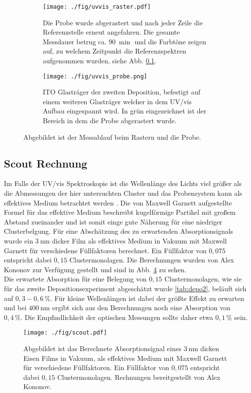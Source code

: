 \begin{figure}
    \begin{subfigure}[b]{0.65\textwidth}
      \texttt{[image: ./fig/uvvis\_raster.pdf]}
      \caption{Die Probe wurde abgerastert und nach jeder Zeile die Referenzstelle erneut angefahren. 
      Die gesamte Messdauer betrug ca. $\SI{90}{\min}$ und die Farbtöne zeigen auf, zu welchem Zeitpunkt die Referenzspektren aufgenommen wurden, siehe Abb. \ref{sec:scoutsim}.}
      \label{fig:uvvis_raster}
    \end{subfigure}\hfill
    \begin{subfigure}[b]{0.325\textwidth}
      \texttt{[image: ./fig/uvvis\_probe.png]}
      \caption{ITO Glasträger der zweiten Deposition, befestigt auf einem weiteren Glasträger welcher in dem UV/vis Aufbau eingespannt wird. In grün eingezeichnet ist der Bereich in dem die Probe abgerastert wurde.}
      \label{fig:uvvis_probe}
    \end{subfigure}
    \caption{Abgebildet ist der Messablauf beim Rastern und die Probe.} 
    \label{fig:uvvis_ablauf}
\end{figure}
\subsection{Scout Rechnung}
\label{sec:scoutsim}
Im Falle der UV/vis Spektroskopie ist die Wellenlänge des Lichts viel größer als die Abmessungen der hier untersuchten Cluster und das Probensystem kann als effektives Medium betrachtet werden \cite[S. 149 ff.]{Thei.1993}.
Die von Maxwell Garnett aufgestellte Formel für das effektive Medium beschreibt kugelförmige Partikel mit großem Abstand zueinander und ist somit einge gute Näherung für eine niedriger Clusterbelgung. 
Für eine Abschätzung des zu erwartenden Absorptionsignals wurde ein $\SI{3}{\nm}$ dicker Film als effektives Medium in Vakuum mit Maxwell Garnett für verschiedene Füllfaktoren berechnet.
Ein Füllfaktor von $0,075$ entspricht dabei $0,15$ Clustermonolagen.
Die Berechnungen wurden von Alex Kononov zur Verfügung gestellt und sind in Abb. \ref{fig:scout} zu sehen.\\

Die erwartete Absorption für eine Belegung von $0,15$ Clustermonolagen, wie sie für das zweite Depositionsexperiment abgeschätzt wurde \ref{tab:depo2}, beläuft sich auf $0,3 - 0,6\,\%$.
Für kleine Wellenlängen ist dabei der größte Effekt zu erwarten und bei $\SI{400}{\nm}$ ergibt sich aus den Berechnungen noch eine Absorption von $0,4\,\%$. Die Empfindlichkeit der optischen Messungen sollte daher etwa $0,1\,\%$ sein.
\begin{figure}[h]
  \centering
  \texttt{[image: ./fig/scout.pdf]}
  \caption{Abgebildet ist das Berechnete Absorptionsignal eines $\SI{3}{\nm}$ dicken Eisen Films in Vakuum, als effektives Medium mit Maxwell Garnett für verschiedene Füllfaktoren. Ein Füllfaktor von $0,075$ entspricht dabei $0,15$ Clustermonolagen. Rechnungen bereitgestellt von Alex Kononov.}
  \label{fig:scout}
\end{figure}

